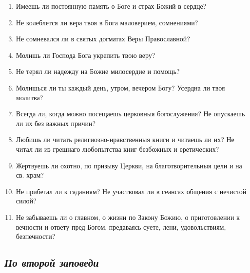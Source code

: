 \begin{enumerate}

\item Имеешь ли постоянную память о Боге и страх Божий в сердце?

\item Не колеблется ли вера твоя в Бога маловерием, сомнениями?

\item Не сомневался ли в святых догматах Веры Православной?

\item Молишь ли Господа Бога укрепить твою веру?

\item Не терял ли надежду на Божие милосердие и помощь?

\item Молишься ли ты каждый день, утром, вечером Богу? Усердна ли твоя молитва?

\item Всегда ли, когда можно посещаешь церковныя богослужения? Не опускаешь ли их без важных причин?

\item Любишь ли читать религиозно-нравственныя книги и читаешь ли их? Не читал ли из грешнаго любопытства книг безбожных и еретических?

\item Жертвуешь ли охотно, по призыву Церкви, на благотворительныя цели и на св. храм?

\item Не прибегал ли к гаданиям? Не участвовал ли в сеансах общения с нечистой силой?

\item Не забываешь ли о главном, о жизни по Закону Божию, о приготовлении к вечности и ответу пред Богом, предаваясь суете, лени, удовольствиям, безпечности? 

\end{enumerate}

\subsection*{\itshape По второй заповеди}

